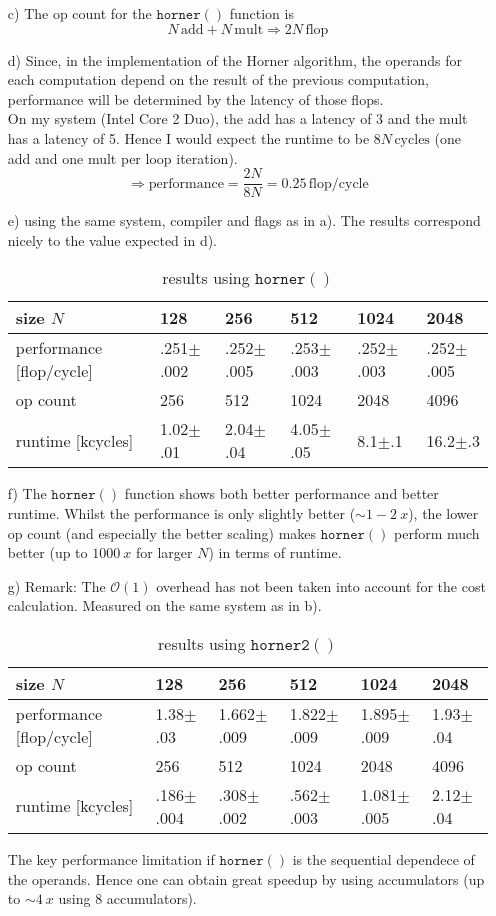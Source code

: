 \documentclass[11pt]{article}
\newcommand{\unit}[1]{\ensuremath{\, \mathrm{#1}}}			%
\begin{document}
\begin{itemize}
		\item[c)] The op count for the $\mathtt{horner()}$ function is 
		\[N \unit{add} + N \unit{mult} \Rightarrow 2N \unit{flop} \] 
		\item[d)] Since, in the implementation of the Horner algorithm, the operands for each computation depend on the result of the previous computation, performance will be determined by the latency of those flops. \\ On my system (Intel Core 2 Duo), the add has a latency of 3 and the mult has a latency of 5. Hence I would expect the runtime to be $8N \unit{cycles}$ (one add and one mult per loop iteration). \[ \Rightarrow \text{performance} =  \frac{2N}{8N} = 0.25 \unit{flop/cycle} \]
		\item[e)] using the same system, compiler and flags as in a). The results correspond nicely to the value expected in d).
		\begin{table}[H]
			\begin{tabular}  {l||l|l|l|l|l}
				size $N$ & 128 & 256 & 512 & 1024 & 2048\\\hline
				performance [flop/cycle] & .251$\pm$.002 & .252$\pm$.005 & .253$\pm$.003 & .252$\pm$.003 & .252$\pm$.005\\\hline
				op count & 256 & 512 & 1024 & 2048 & 4096\\\hline
				runtime [kcycles] & 1.02$\pm$.01 & 2.04$\pm$.04 & 4.05$\pm$.05 & 8.1$\pm$.1 & 16.2$\pm$.3\\
				
			\end{tabular}
			\caption{results using $\mathtt{horner()}$}
		\end{table}
		\item[f)] The $\mathtt{horner()}$ function shows both better performance and better runtime. Whilst the performance is only slightly better ($\sim 1 - 2 ~x$), the lower op count (and especially the better scaling) makes $\mathtt{horner()}$ perform much better (up to $1000 ~ x$ for larger $N$) in terms of runtime. 
		\item[g)] Remark: The $\mathcal{O}(1)$ overhead has not been taken into account for the cost calculation. Measured on the same system as in b).
		\begin{table}[H]
		\begin{tabular}  {l||l|l|l|l|l}
			size $N$ & 128 & 256 & 512 & 1024 & 2048\\\hline
			performance [flop/cycle] & 1.38$\pm$.03 & 1.662$\pm$.009 & 1.822$\pm$.009 & 1.895$\pm$.009 & 1.93$\pm$.04\\\hline
			op count & 256 & 512 & 1024 & 2048 & 4096\\\hline
			runtime [kcycles] & .186$\pm$.004 & .308$\pm$.002 & .562$\pm$.003 & 1.081$\pm$.005 & 2.12$\pm$.04\\
			
		\end{tabular}
		\caption{results using $\mathtt{horner2()}$}
		\end{table}
		The key performance limitation if $\mathtt{horner()}$ is the sequential dependece of the operands. Hence one can obtain great speedup by using accumulators (up to $\sim 4 ~x$ using 8 accumulators).
	\end{itemize}
\end{document}
